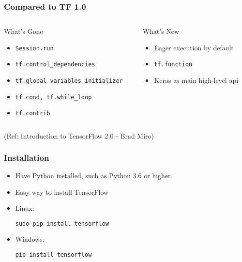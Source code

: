 \begin{frame}[fragile] \frametitle{Compared to TF 1.0}

\begin{columns}
    \begin{column}[T]{0.6\linewidth}
	What’s Gone
      \begin{itemize}
		\item \lstinline|Session.run|
		\item \lstinline|tf.control_dependencies|
		\item \lstinline|tf.global_variables_initializer|
		\item \lstinline|tf.cond, tf.while_loop|
		\item \lstinline|tf.contrib|
	  \end{itemize}

    \end{column}
    \begin{column}[T]{0.4\linewidth}
	What’s New
      \begin{itemize}
		\item Eager execution by default
		\item \lstinline|tf.function|
		\item Keras as main high-level api
	  \end{itemize}
    \end{column}
  \end{columns}

\tiny{(Ref: Introduction to TensorFlow 2.0 - Brad Miro)}
\end{frame}






\begin{frame}[fragile] \frametitle{Installation}

\begin{itemize}
\item Have Python installed, such as Python 3.6 or higher.
\item Easy way to install TensorFlow
\item Linux:
\begin{lstlisting}
sudo pip install tensorflow
\end{lstlisting}
\item Windows:
\begin{lstlisting}
pip install tensorflow
\end{lstlisting}
\end{itemize}

\end{frame}



